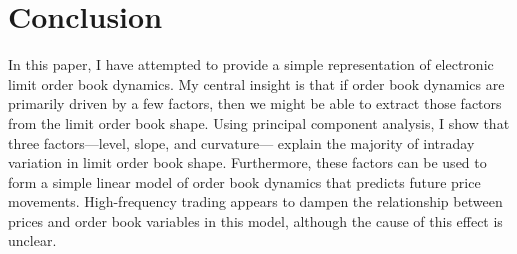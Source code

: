 \section{Conclusion}
	In this paper, I have attempted to provide a simple representation of electronic limit order book dynamics. My central insight is that if order book dynamics are primarily driven by a few factors, then we might be able to extract those factors from the limit order book shape. Using principal component analysis, I show that three factors---level, slope, and curvature--- explain the majority of intraday variation in limit order book shape. Furthermore, these factors can be used to form a simple linear model of order book dynamics that predicts future price movements. High-frequency trading appears to dampen the relationship between prices and order book variables in this model, although the cause of this effect is unclear.


